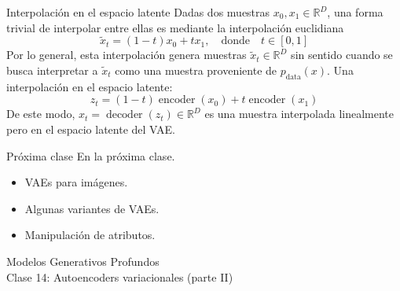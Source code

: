 \documentclass{beamer}
\newcommand{\R}{\mathbb{R}}
\begin{document}
\begin{frame}{Interpolación en el espacio latente}
    Dadas dos muestras $x_0,x_1\in\R^D$, una forma trivial de interpolar entre ellas es mediante la interpolación euclidiana
    \begin{equation*}
        \tilde x_t =(1-t)x_0+tx_1,
        \quad\text{donde}\quad
        t\in[0,1]
    \end{equation*}
    Por lo general, esta interpolación genera muestras $\tilde x_t\in\R^D$ sin sentido cuando se busca interpretar a $\tilde x_t$ como una muestra proveniente de $p_\text{data}(x)$. Una interpolación en el espacio latente:
    \begin{equation*}
        z_t=(1-t)\operatorname{encoder}(x_0)+t\operatorname{encoder}(x_1)
    \end{equation*}
    De este modo, $x_t=\operatorname{decoder}(z_t)\in\R^D$ es una muestra interpolada linealmente pero en el espacio latente del VAE.
\end{frame}

\begin{frame}{Próxima clase}
    En la próxima clase.
    \begin{itemize}
        \item VAEs para imágenes.
        \item Algunas variantes de VAEs.
        \item Manipulación de atributos.
    \end{itemize}
\end{frame}

\begin{frame}
    \centering
    \Large{Modelos Generativos Profundos}\\
    \large{Clase 14: Autoencoders variacionales (parte II)}
\end{frame}
\end{document}
